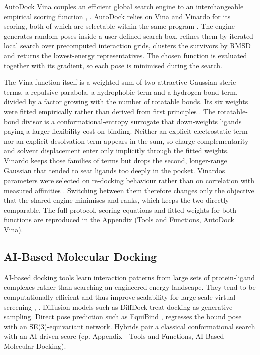 AutoDock Vina couples an efficient global search engine to an interchangeable empirical scoring function \cite{ref022}, \cite{ref023}. AutoDock relies on Vina and Vinardo for its scoring, both of which are selectable within the same program \cite{ref023}. The engine generates random poses inside a user-defined search box, refines them by iterated local search over precomputed interaction grids, clusters the survivors by RMSD and returns the lowest-energy representatives. The chosen function is evaluated together with its gradient, so each pose is minimised during the search.

The Vina function itself is a weighted sum of two attractive Gaussian steric terms, a repulsive parabola, a hydrophobic term and a hydrogen-bond term, divided by a factor growing with the number of rotatable bonds. Its six weights were fitted empirically rather than derived from first principles \cite{ref022}. The rotatable-bond divisor is a conformational-entropy surrogate that down-weights ligands paying a larger flexibility cost on binding. Neither an explicit electrostatic term nor an explicit desolvation term appears in the sum, so charge complementarity and solvent displacement enter only implicitly through the fitted weights. Vinardo keeps those families of terms but drops the second, longer-range Gaussian that tended to seat ligands too deeply in the pocket. Vinardo\textquotesingle s parameters were selected on re-docking behaviour rather than on correlation with measured affinities \cite{ref073}. Switching between them therefore changes only the objective that the shared engine minimises and ranks, which keeps the two directly comparable. The full protocol, scoring equations and fitted weights for both functions are reproduced in the Appendix (Tools and Functions, AutoDock Vina).

\hypertarget{ai-based-molecular-docking}{%
\subsection{AI-Based Molecular Docking}\label{ai-based-molecular-docking}}

AI-based docking tools learn interaction patterns from large sets of protein-ligand complexes rather than searching an engineered energy landscape. They tend to be computationally efficient and thus improve scalability for large-scale virtual screening \cite{ref010}, \cite{ref027}. Diffusion models such as DiffDock \cite{ref024} treat docking as generative sampling. Direct pose prediction such as EquiBind \cite{ref009}, \cite{ref010} regresses the bound pose with an SE(3)-equivariant network. Hybrids pair a classical conformational search with an AI-driven score (cp. Appendix - Tools and Functions, AI-Based Molecular Docking).

